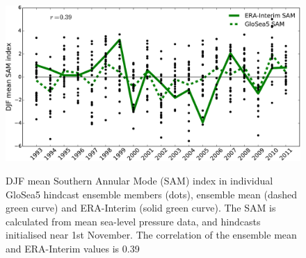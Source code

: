 \begin{figure}[t]
  \noindent\includegraphics[width=\textwidth,angle=0]{figures/chapter-seasonal/DJF_SAM.pdf}\\
  \caption[GloSea5 predictions of the SAM.]{DJF mean Southern Annular Mode (SAM)
    index in individual GloSea5 hindcast ensemble members (dots), ensemble mean
    (dashed green curve) and ERA-Interim (solid green curve). The SAM is
    calculated from mean sea-level pressure data, and hindcasts initialised near
    1st November. The correlation of the ensemble mean and ERA-Interim values is
    0.39}\label{fig:djf_sam_ts}
\end{figure}


